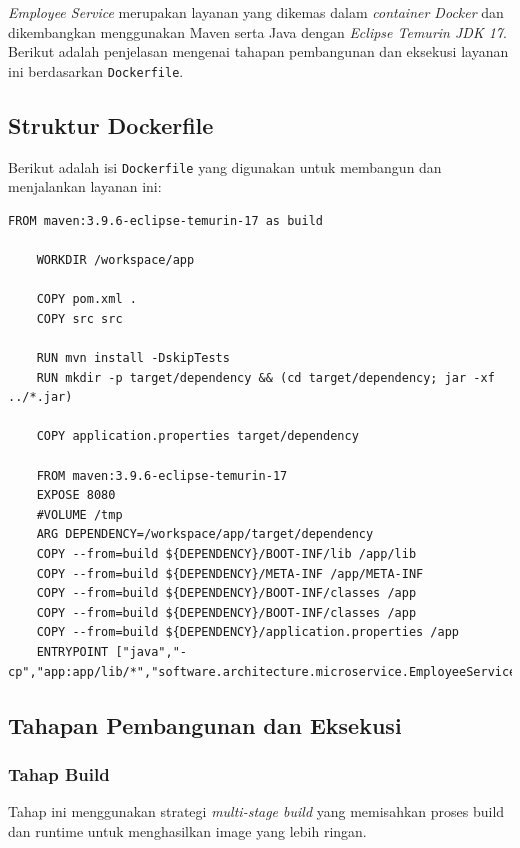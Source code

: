 \textit{Employee Service} merupakan layanan yang dikemas dalam \textit{container Docker} dan dikembangkan menggunakan Maven serta Java dengan \textit{Eclipse Temurin JDK 17}. Berikut adalah penjelasan mengenai tahapan pembangunan dan eksekusi layanan ini berdasarkan \texttt{Dockerfile}.

\subsection{Struktur Dockerfile}

Berikut adalah isi \texttt{Dockerfile} yang digunakan untuk membangun dan menjalankan layanan ini:

\begin{lstlisting}[language=docker]
	FROM maven:3.9.6-eclipse-temurin-17 as build
	
	WORKDIR /workspace/app
	
	COPY pom.xml .
	COPY src src
	
	RUN mvn install -DskipTests
	RUN mkdir -p target/dependency && (cd target/dependency; jar -xf ../*.jar)
	
	COPY application.properties target/dependency
	
	FROM maven:3.9.6-eclipse-temurin-17
	EXPOSE 8080
	#VOLUME /tmp
	ARG DEPENDENCY=/workspace/app/target/dependency
	COPY --from=build ${DEPENDENCY}/BOOT-INF/lib /app/lib
	COPY --from=build ${DEPENDENCY}/META-INF /app/META-INF
	COPY --from=build ${DEPENDENCY}/BOOT-INF/classes /app
	COPY --from=build ${DEPENDENCY}/BOOT-INF/classes /app
	COPY --from=build ${DEPENDENCY}/application.properties /app
	ENTRYPOINT ["java","-cp","app:app/lib/*","software.architecture.microservice.EmployeeServiceApplication"]
\end{lstlisting}

\subsection{Tahapan Pembangunan dan Eksekusi}

\subsubsection{Tahap Build}
Tahap ini menggunakan strategi \textit{multi-stage build} yang memisahkan proses build dan runtime untuk menghasilkan image yang lebih ringan.

